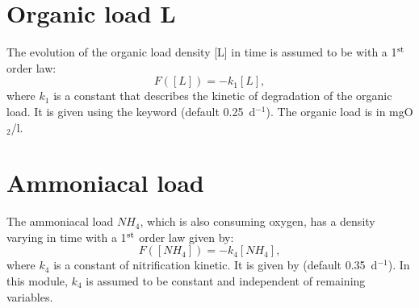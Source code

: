 \section{Organic load L}

The evolution of the organic load density [L] in time is assumed
to be with a 1$^{\rm{st}}$ order law:
\begin{equation*}
 F([L]) = -k_1 [L],
\end{equation*}
where $k_1$ is a constant that describes the kinetic of degradation of the organic load.
It is given using the keyword 
(default 0.25~d$^{-1}$).
The organic load is in mgO$_2$/l.


\section{Ammoniacal load}

The ammoniacal load $NH_4$, which is also consuming oxygen,
has a density varying in time with a 1$^{\rm{st}}$ order law given by:
\begin{equation*}
 F([NH_4]) = -k_4 [NH_4],
\end{equation*}
where $k_4$ is a constant of nitrification kinetic.
It is given by  (default 0.35~d$^{-1}$).
In this module, $k_4$ is assumed to be constant and independent of remaining variables.




